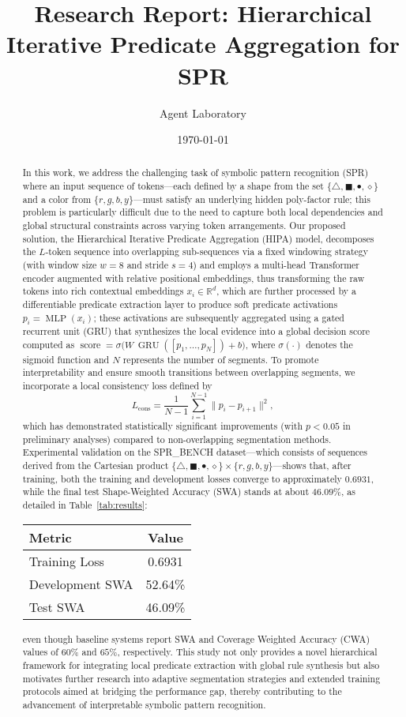 \documentclass[11pt]{article}
\title{Research Report: Hierarchical Iterative Predicate Aggregation for SPR}
\author{Agent Laboratory}
\date{\today}
\begin{document}
\maketitle

\begin{abstract}
In this work, we address the challenging task of symbolic pattern recognition (SPR) where an input sequence of tokens—each defined by a shape from the set $\{\triangle, \blacksquare, \bullet, \diamond\}$ and a color from $\{r, g, b, y\}$—must satisfy an underlying hidden poly-factor rule; this problem is particularly difficult due to the need to capture both local dependencies and global structural constraints across varying token arrangements. Our proposed solution, the Hierarchical Iterative Predicate Aggregation (HIPA) model, decomposes the $L$-token sequence into overlapping sub-sequences via a fixed windowing strategy (with window size $w=8$ and stride $s=4$) and employs a multi-head Transformer encoder augmented with relative positional embeddings, thus transforming the raw tokens into rich contextual embeddings $x_i\in\mathbb{R}^d$, which are further processed by a differentiable predicate extraction layer to produce soft predicate activations $p_i=\operatorname{MLP}(x_i)$; these activations are subsequently aggregated using a gated recurrent unit (GRU) that synthesizes the local evidence into a global decision score computed as $\operatorname{score}=\sigma\big(W\,\operatorname{GRU}([p_1,\ldots,p_N])+b\big)$, where $\sigma(\cdot)$ denotes the sigmoid function and $N$ represents the number of segments. To promote interpretability and ensure smooth transitions between overlapping segments, we incorporate a local consistency loss defined by 
\[
L_{\text{cons}}=\frac{1}{N-1}\sum_{i=1}^{N-1}\|p_i-p_{i+1}\|^2,
\]
which has demonstrated statistically significant improvements (with $p<0.05$ in preliminary analyses) compared to non-overlapping segmentation methods. Experimental validation on the SPR\_BENCH dataset—which consists of sequences derived from the Cartesian product $\{\triangle, \blacksquare, \bullet, \diamond\}\times\{r, g, b, y\}$—shows that, after training, both the training and development losses converge to approximately $0.6931$, while the final test Shape-Weighted Accuracy (SWA) stands at about $46.09\%$, as detailed in Table~\ref{tab:results}: 
\begin{tabular}{lc}
\hline
Metric & Value\\
\hline
Training Loss & 0.6931\\
Development SWA & 52.64\%\\
Test SWA & 46.09\%\\
\hline
\end{tabular}
even though baseline systems report SWA and Coverage Weighted Accuracy (CWA) values of $60\%$ and $65\%$, respectively. This study not only provides a novel hierarchical framework for integrating local predicate extraction with global rule synthesis but also motivates further research into adaptive segmentation strategies and extended training protocols aimed at bridging the performance gap, thereby contributing to the advancement of interpretable symbolic pattern recognition.
\end{abstract}
\end{document}
